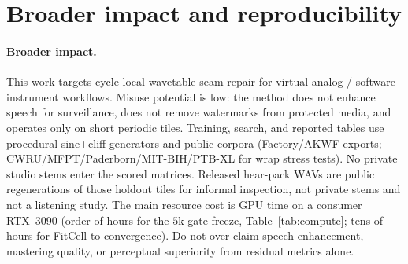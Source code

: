 \section{Broader impact and reproducibility}
\label{sec:ethics}

\paragraph{Broader impact.}
This work targets cycle-local wavetable seam repair for virtual-analog / software-instrument workflows.
Misuse potential is low: the method does not enhance speech for surveillance, does not remove watermarks from protected media, and operates only on short periodic tiles.
Training, search, and reported tables use procedural sine{+}cliff generators and public corpora (Factory/AKWF exports; CWRU/MFPT/Paderborn/MIT-BIH/PTB-XL for wrap stress tests).
No private studio stems enter the scored matrices.
Released hear-pack WAVs are public regenerations of those holdout tiles for informal inspection, not private stems and not a listening study.
The main resource cost is GPU time on a consumer RTX~3090 (order of hours for the $5$k-gate freeze, Table~\ref{tab:compute}; tens of hours for FitCell-to-convergence).
Do not over-claim speech enhancement, mastering quality, or perceptual superiority from residual metrics alone.

